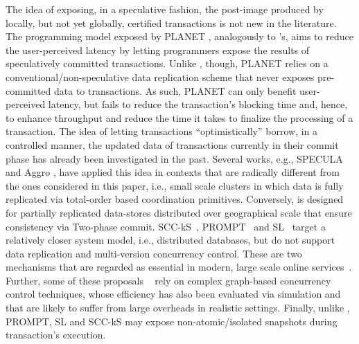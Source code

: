 The idea of exposing, in a speculative fashion, the post-image produced by locally, but not yet globally, certified transactions is not new in the literature. The programming model exposed by PLANET \cite{pang2014planet}, analogously to \specula's,  aims to reduce the user-perceived latency by letting programmers expose the results of speculatively committed transactions. Unlike \specula, though, PLANET relies on a conventional/non-speculative data replication scheme that  never exposes pre-committed data to transactions. As such, PLANET can only benefit user-perceived latency, but fails to reduce the transaction's blocking time and, hence, to enhance throughput and reduce the time it takes to finalize the processing of a transaction. 
The idea of letting transactions ``optimistically'' borrow, in a controlled manner, the updated data of transactions currently in their commit phase has already been investigated in the past. Several works, e.g., SPECULA \cite{peluso2012specula} and Aggro \cite{palmieri2010aggro}, have applied this idea in contexts that are radically different from the ones considered in this paper, i.e.,  small scale clusters in which  data is fully replicated via total-order based coordination primitives. Conversely, \specula is designed for partially replicated data-stores distributed over geographical scale that ensure consistency via Two-phase commit.  SCC-kS~\cite{bestavros1996value}, PROMPT~\cite{PROMPT} and SL~\cite{Reddy} target a relatively closer system model, i.e., distributed databases, but do not support data replication and multi-version concurrency control. These are two mechanisms that are regarded as essential in modern, large scale online services~\cite{spanner,baker2011megastore,peluso2012score}. Further, some of these proposals ~\cite{bestavros1996value, Romano-2014} rely on complex graph-based concurrency control techniques, whose efficiency has also been evaluated via simulation and that are likely to suffer from large overheads in realistic settings. Finally, unlike \specula, PROMPT, SL and SCC-kS may expose non-atomic/isolated snapshots during transaction's execution.